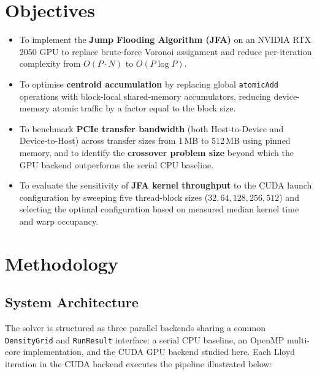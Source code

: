 \documentclass[12pt,a4paper]{article}
\begin{document}
\section{Objectives}

\begin{itemize}
    \item To implement the \textbf{Jump Flooding Algorithm (JFA)} on an NVIDIA
          RTX 2050 GPU to replace brute-force Voronoi assignment and reduce
          per-iteration complexity from $O(P \cdot N)$ to $O(P \log P)$.
    \item To optimise \textbf{centroid accumulation} by replacing global
          \texttt{atomicAdd} operations with block-local shared-memory
          accumulators, reducing device-memory atomic traffic by a factor equal
          to the block size.
    \item To benchmark \textbf{PCIe transfer bandwidth} (both Host-to-Device and
          Device-to-Host) across transfer sizes from 1\,MB to 512\,MB using
          pinned memory, and to identify the \textbf{crossover problem size}
          beyond which the GPU backend outperforms the serial CPU baseline.
    \item To evaluate the sensitivity of \textbf{JFA kernel throughput} to the
          CUDA launch configuration by sweeping five thread-block sizes
          ($32, 64, 128, 256, 512$) and selecting the optimal configuration
          based on measured median kernel time and warp occupancy.
\end{itemize}

\newpage
\section{Methodology}

\subsection{System Architecture}

The solver is structured as three parallel backends sharing a common
\texttt{DensityGrid} and \texttt{RunResult} interface: a serial CPU baseline,
an OpenMP multi-core implementation, and the CUDA GPU backend studied here.
Each Lloyd iteration in the CUDA backend executes the pipeline illustrated
below:
\end{document}
